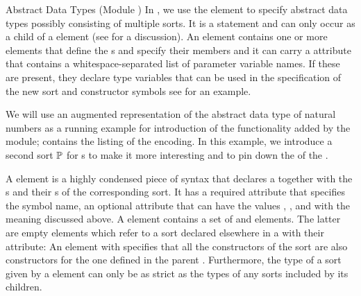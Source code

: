 \begin{tchapter}[id=adt,short=Abstract Data Types]{Abstract Data Types (Module {})}
\noindent In {\omdoc}, we use the {} element to specify
abstract data types possibly consisting of multiple sorts.  It is a
{} statement and can only occur as a
child of a {} element (see
{} for a discussion). An
{} element contains one or more {}
elements that define the {s} and specify their
members and it can carry a {} attribute
that contains a whitespace-separated list of parameter variable
names. If these are present, they declare type variables that can be
used in the specification of the new sort and constructor symbols
see {} for an example.

We will use an augmented representation of the abstract data type of natural numbers as a
running example for introduction of the functionality added by the {}
module; {} contains the listing of the {\omdoc} encoding. In this
example, we introduce a second sort ${\mathbb{P}}$ for {s} to
make it more interesting and to pin down the {} of the
{}.

A {} element is a highly condensed piece of syntax that declares a
{} together with the {s} and their
{s} of the corresponding sort. It has a required
{} attribute that specifies the symbol name, an optional
{} attribute that can have the values {},
{}, and {} with the meaning
discussed above. A {} element contains a set of {} and
{} elements.  The latter are empty elements which refer to a sort declared
elsewhere in a {} with their {} attribute: An
{} element with
{} specifies that all the
constructors of the sort {} are also constructors for the one
defined in the parent {}.  Furthermore, the type of a sort given by a
{} element can only be as strict as the types of any sorts included by
its {} children.


\end{tchapter}
